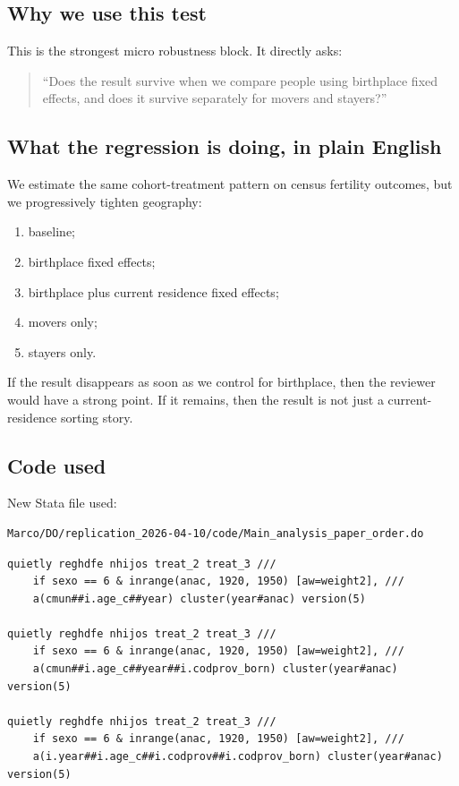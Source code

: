 \documentclass[11pt]{article}
\begin{document}
\subsection*{Why we use this test}

This is the strongest micro robustness block. It directly asks:

\begin{quote}
``Does the result survive when we compare people using birthplace fixed effects, and does it survive separately for movers and stayers?''
\end{quote}

\subsection*{What the regression is doing, in plain English}

We estimate the same cohort-treatment pattern on census fertility outcomes, but we progressively tighten geography:
\begin{enumerate}[leftmargin=*]
\item baseline;
\item birthplace fixed effects;
\item birthplace plus current residence fixed effects;
\item movers only;
\item stayers only.
\end{enumerate}

If the result disappears as soon as we control for birthplace, then the reviewer would have a strong point. If it remains, then the result is not just a current-residence sorting story.

\subsection*{Code used}

New Stata file used:

\begin{verbatim}
Marco/DO/replication_2026-04-10/code/Main_analysis_paper_order.do
\end{verbatim}

\begin{verbatim}
quietly reghdfe nhijos treat_2 treat_3 ///
    if sexo == 6 & inrange(anac, 1920, 1950) [aw=weight2], ///
    a(cmun##i.age_c##year) cluster(year#anac) version(5)

quietly reghdfe nhijos treat_2 treat_3 ///
    if sexo == 6 & inrange(anac, 1920, 1950) [aw=weight2], ///
    a(cmun##i.age_c##year##i.codprov_born) cluster(year#anac) version(5)

quietly reghdfe nhijos treat_2 treat_3 ///
    if sexo == 6 & inrange(anac, 1920, 1950) [aw=weight2], ///
    a(i.year##i.age_c##i.codprov##i.codprov_born) cluster(year#anac) version(5)
\end{verbatim}
\end{document}
